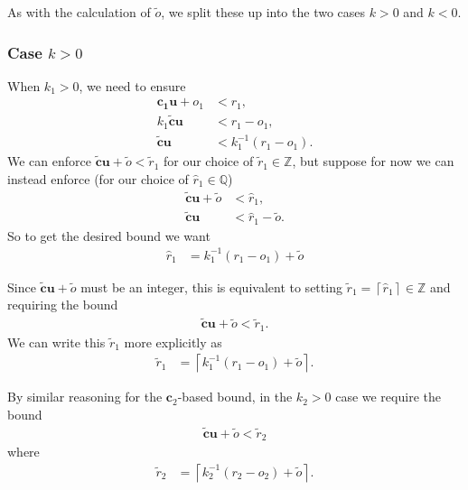 \documentclass[11pt]{article}
\newcommand{\vect}[1]{\mathbf{#1}}
\newcommand{\ceil}[1]{{\left\lceil{#1}\right\rceil}}
\begin{document}
As with the calculation of $\widetilde{o}$, we split these up into the two cases $k > 0$ and $k < 0$.

\subsubsection{Case $k > 0$}

When $k_1 > 0$, we need to ensure
\begin{align*}
\vect{c_1}\vect{u} + o_1 &< r_1, \\
k_1 \widetilde{\vect{c}}\vect{u} &< r_1 - o_1, \\
\widetilde{\vect{c}}\vect{u} &< k_1^{-1}(r_1 - o_1).
\end{align*}
We can enforce $\widetilde{\vect{c}}\vect{u} + \widetilde{o} < \widetilde{r}_1$ for our choice of $\widetilde{r}_1 \in \mathbb{Z}$, but suppose for now we can instead enforce (for our choice of $\widehat{r}_1\in\mathbb{Q}$)
\begin{align*}
\widetilde{\vect{c}}\vect{u} + \widetilde{o} &< \widehat{r}_1, \\
\widetilde{\vect{c}}\vect{u} &< \widehat{r}_1 - \widetilde{o}.
\end{align*}
So to get the desired bound we want
\begin{align*}
\widehat{r}_1 &= k_1^{-1}(r_1 - o_1) + \widetilde{o}
\end{align*}

Since $\widetilde{\vect{c}}\vect{u} + \widetilde{o}$ must be an integer, this is equivalent to setting $\widetilde{r}_1 = \ceil{\widehat{r}_1}\in\mathbb{Z}$ and requiring the bound
\begin{align*}
\widetilde{\vect{c}}\vect{u} + \widetilde{o} < \widetilde{r}_1.
\end{align*}
We can write this $\widetilde{r}_1$ more explicitly as
\begin{align}
\widetilde{r}_1 &= \ceil{k_1^{-1}(r_1 - o_1) + \widetilde{o}}. \label{r1k+}
\end{align}

By similar reasoning for the $\vect{c}_2$-based bound, in the $k_2 > 0$ case we require the bound
\begin{align*}
\widetilde{\vect{c}}\vect{u} + \widetilde{o} < \widetilde{r}_2
\end{align*}
where
\begin{align}
\widetilde{r}_2 &= \ceil{k_2^{-1}(r_2 - o_2) + \widetilde{o}}. \label{r2k+}
\end{align}
\end{document}
